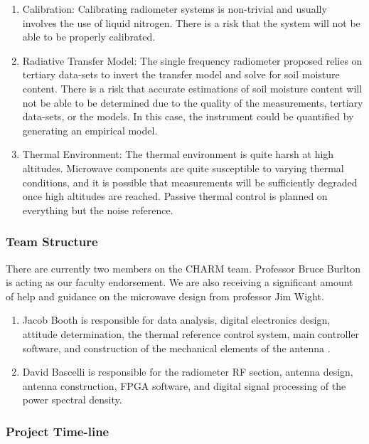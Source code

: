 \documentclass[12pt]{article}
\begin{document}
\begin{enumerate}
\begin{enumerate}
\item Calibration: Calibrating radiometer systems is non-trivial and usually involves the use of liquid nitrogen. There is a risk that the system will not be able to be properly calibrated.

\item Radiative Transfer Model: The single frequency radiometer proposed relies on tertiary data-sets to invert the transfer model and solve for soil moisture content. There is a risk that accurate estimations of soil moisture content will not be able to be determined due to the quality of the measurements, tertiary data-sets, or the models. In this case, the instrument could be quantified by generating an empirical model.

\item Thermal Environment: The thermal environment is quite harsh at high altitudes. Microwave components are quite susceptible to varying thermal conditions, and it is possible that measurements will be sufficiently degraded once high altitudes are reached. Passive thermal control is planned on everything but the noise reference.

\end{enumerate}
\end{enumerate}

\subsubsection{Team Structure}
There are currently two members on the CHARM team. Professor Bruce Burlton is acting as our faculty endorsement. We are also receiving a significant amount of help and guidance on the microwave design from professor Jim Wight.

\begin{enumerate}
\item Jacob Booth is responsible for data analysis, digital electronics design, attitude determination, the thermal reference control system, main controller software, and construction of the mechanical elements of the antenna .

\item David Bascelli is responsible for the radiometer RF section, antenna design, antenna construction, FPGA software, and digital signal processing of the power spectral density.

\end{enumerate}

\subsubsection{Project Time-line}
\end{document}

